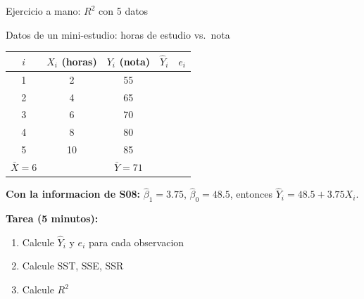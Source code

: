 \documentclass[aspectratio=169, 11pt]{beamer}
\begin{document}

\begin{frame}{Ejercicio a mano: $R^2$ con 5 datos}
\small
\begin{block}{Datos de un mini-estudio: horas de estudio vs.\ nota}
\begin{center}
\begin{tabular}{ccccc}
\toprule
$i$ & $X_i$ (horas) & $Y_i$ (nota) & $\hat{Y}_i$ & $e_i$ \\
\midrule
1 & 2 & 55 & & \\
2 & 4 & 65 & & \\
3 & 6 & 70 & & \\
4 & 8 & 80 & & \\
5 & 10 & 85 & & \\
\midrule
$\bar{X} = 6$ & & $\bar{Y} = 71$ & & \\
\bottomrule
\end{tabular}
\end{center}
\end{block}

\textbf{Con la informacion de S08:} $\hat{\beta}_1 = 3.75$, $\hat{\beta}_0 = 48.5$, entonces $\hat{Y}_i = 48.5 + 3.75 X_i$.

\vspace{0.1cm}
\textbf{Tarea (5 minutos):}
\begin{enumerate}\setlength{\itemsep}{0pt}
  \item Calcule $\hat{Y}_i$ y $e_i$ para cada observacion
  \item Calcule SST, SSE, SSR
  \item Calcule $R^2$
\end{enumerate}
\end{frame}
\end{document}
